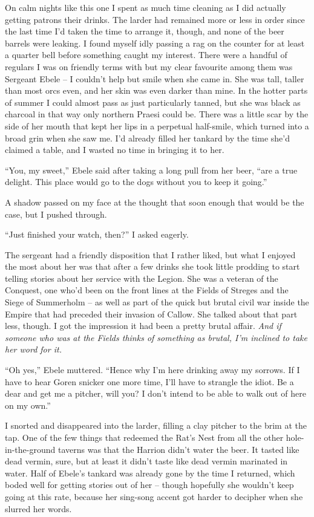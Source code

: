 \documentclass[12pt, openany]{book}
\begin{document}
On calm nights like this one I spent as much time cleaning as I did actually getting patrons their drinks. The larder had remained more or less in order since the last time I’d taken the time to arrange it, though, and none of the beer barrels were leaking. I found myself idly passing a rag on the counter for at least a quarter bell before something caught my interest. There were a handful of regulars I was on friendly terms with but my clear favourite among them was Sergeant Ebele – I couldn’t help but smile when she came in. She was tall, taller than most orcs even, and her skin was even darker than mine. In the hotter parts of summer I could almost pass as just particularly tanned, but she was black as charcoal in that way only northern Praesi could be. There was a little scar by the side of her mouth that kept her lips in a perpetual half-smile, which turned into a broad grin when she saw me. I’d already filled her tankard by the time she’d claimed a table, and I wasted no time in bringing it to her.

“You, my sweet,” Ebele said after taking a long pull from her beer, “are a true delight. This place would go to the dogs without you to keep it going.”

A shadow passed on my face at the thought that soon enough that would be the case, but I pushed through.

“Just finished your watch, then?” I asked eagerly.

The sergeant had a friendly disposition that I rather liked, but what I enjoyed the most about her was that after a few drinks she took little prodding to start telling stories about her service with the Legion. She was a veteran of the Conquest, one who’d been on the front lines at the Fields of Streges and the Siege of Summerholm – as well as part of the quick but brutal civil war inside the Empire that had preceded their invasion of Callow. She talked about that part less, though. I got the impression it had been a pretty brutal affair. \textit{And if someone who was at the Fields thinks of something as brutal, I’m inclined to take her word for it.}

“Oh yes,” Ebele muttered. “Hence why I’m here drinking away my sorrows. If I have to hear Goren snicker one more time, I’ll have to strangle the idiot. Be a dear and get me a pitcher, will you? I don’t intend to be able to walk out of here on my own.”

I snorted and disappeared into the larder, filling a clay pitcher to the brim at the tap. One of the few things that redeemed the Rat’s Nest from all the other hole-in-the-ground taverns was that the Harrion didn’t water the beer. It tasted like dead vermin, sure, but at least it didn’t taste like dead vermin marinated in water. Half of Ebele’s tankard was already gone by the time I returned, which boded well for getting stories out of her – though hopefully she wouldn’t keep going at this rate, because her sing-song accent got harder to decipher when she slurred her words.
\end{document}
